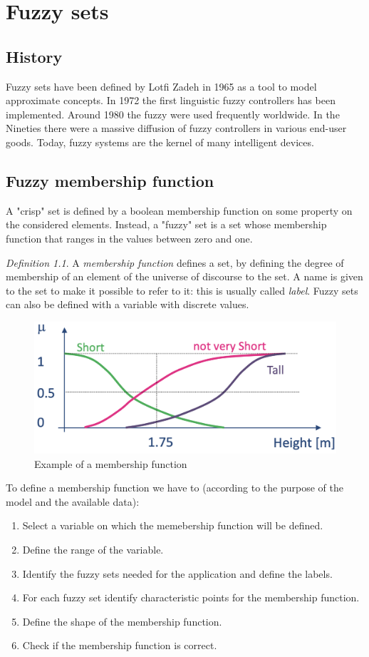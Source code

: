 \documentclass[12pt, a4paper]{report}
\theoremstyle{remark}
\newtheorem*{remark}{Definition}
\theoremstyle{definition}
\begin{document}
    \newpage

    \chapter{Fuzzy sets}
    \section{History}
    Fuzzy sets have been defined by Lotfi Zadeh in 1965 as a tool to model approximate concepts. In 1972 the first linguistic fuzzy
    controllers has been implemented. Around 1980 the fuzzy were used frequently worldwide. In the Nineties there were a massive 
    diffusion of fuzzy controllers in various end-user goods. Today, fuzzy systems are the kernel of many intelligent devices. 

    \section{Fuzzy membership function}
    A "crisp" set is defined by a boolean membership function on some property on the considered elements. Instead, a "fuzzy" set is
    a set whose membership function that ranges in the values between zero and one.
    \begin{remark}
        A \emph{membership function} defines a set, by defining the degree of membership of an element of the universe of discourse 
        to the set. A name is given to the set to make it possible to refer to it: this is usually called \emph{label}. Fuzzy sets can 
        also be defined with a variable with discrete values. 
    \end{remark}
    \begin{figure}[H]
        \centering
        \includegraphics[width=0.50\linewidth]{images/function.png}
        \caption{Example of a membership function}
    \end{figure}
    To define a membership function we have to (according to the purpose of the model and the available data):
    \begin{enumerate}
        \item Select a variable on which the memebership function will be defined. 
        \item Define the range of the variable.
        \item Identify the fuzzy sets needed for the application and define the labels. 
        \item For each fuzzy set identify characteristic points for the membership function.
        \item Define the shape of the membership function.
        \item Check if the membership function is correct.
    \end{enumerate}
\end{document}
